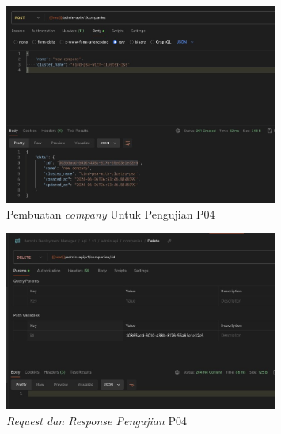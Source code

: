 \begin{figure}[ht]
  \centering
  \includegraphics[width=0.8\textwidth]{resources/chapter-4/pengujian/p04-1.jpg}
  \caption{Pembuatan \textit{company} Untuk Pengujian P04}
  \label{fig:pengujian-p04-1}
\end{figure}

\begin{figure}[ht]
  \centering
  \includegraphics[width=0.8\textwidth]{resources/chapter-4/pengujian/p04.jpg}
  \caption{\textit{Request dan Response Pengujian} P04}
  \label{fig:pengujian-p04}
\end{figure}

